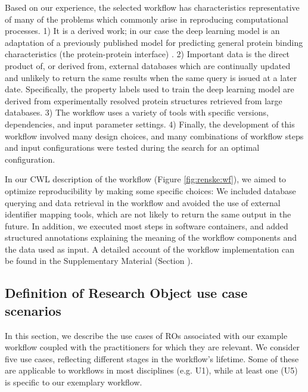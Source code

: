 
Based on our experience, the selected workflow has characteristics representative of many of the problems which commonly arise in reproducing computational processes. 1) It is a derived work; in our case the deep learning model is an adaptation of a previously published model for predicting general protein binding characteristics (the protein-protein interface) \cite{capelMultitaskLearningLeverage2022}. 2) Important data is the direct product of, or derived from, external databases which are continually updated and unlikely to return the same results when the same query is issued at a later date. Specifically, the property labels used to train the deep learning model are derived from experimentally resolved protein structures retrieved from large databases. 3) The workflow uses a variety of tools with specific versions, dependencies, and input parameter settings. 4) Finally, the development of this workflow involved many design choices, and many combinations of workflow steps and input configurations were tested during the search for an optimal configuration.

In our CWL description of the workflow (Figure \ref{fig:renske:wf}), we aimed to optimize reproducibility by making some specific choices: We included database querying and data retrieval in the workflow and avoided the use of external identifier mapping tools, which are not likely to return the same output in the future. In addition, we executed most steps in software containers, and added structured annotations explaining the meaning of the workflow components and the data used as input. A detailed account of the workflow implementation can be found in the Supplementary Material (Section \emph{}). 

\subsection{Definition of Research Object use case scenarios}
\label{sec:renske:stakeholders}

In this section, we describe the use cases of ROs associated with our example workflow coupled with the practitioners for which they are relevant. We consider five use cases, reflecting different stages in the workflow's lifetime. Some of these are applicable to workflows in most disciplines (e.g. U1), while at least one (U5) is specific to our exemplary workflow.

